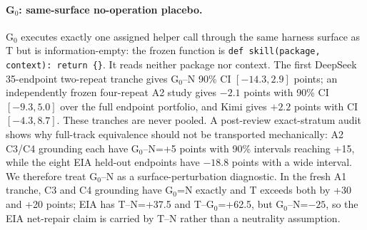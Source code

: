 \paragraph{G$_0$: same-surface no-operation placebo.}
G$_0$ executes exactly one assigned helper call through the same harness surface as T but is information-empty: the frozen function is \texttt{def skill(package, context): return \{\}}. It reads neither package nor context. The first DeepSeek 35-endpoint two-repeat tranche gives G$_0$--N 90\% CI $[-14.3,2.9]$ points; an independently frozen four-repeat A2 study gives $-2.1$ points with 90\% CI $[-9.3,5.0]$ over the full endpoint portfolio, and Kimi gives $+2.2$ points with CI $[-4.3,8.7]$. These tranches are never pooled. A post-review exact-stratum audit shows why full-track equivalence should not be transported mechanically: A2 C3/C4 grounding each have G$_0$--N=+5 points with 90\% intervals reaching +15, while the eight EIA held-out endpoints have $-18.8$ points with a wide interval. We therefore treat G$_0$--N as a surface-perturbation diagnostic. In the fresh A1 tranche, C3 and C4 grounding have G$_0$=N exactly and T exceeds both by +30 and +20 points; EIA has T--N=+37.5 and T--G$_0$=+62.5, but G$_0$--N=$-25$, so the EIA net-repair claim is carried by T--N rather than a neutrality assumption.

